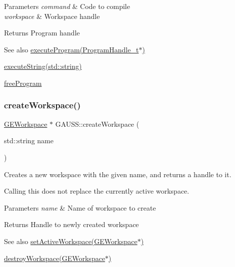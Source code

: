 \begin{DoxyParams}{Parameters}
{\em command} & Code to compile \\
\hline
{\em workspace} & Workspace handle \\
\hline
\end{DoxyParams}
\begin{DoxyReturn}{Returns}
Program handle
\end{DoxyReturn}
\begin{DoxySeeAlso}{See also}
\hyperlink{class_g_a_u_s_s_a7fc9de69421c14aadb9a6310fecabcca}{execute\+Program(\+Program\+Handle\+\_\+t$\ast$)} 

\hyperlink{class_g_a_u_s_s_a3680b0addd695d8a5690a1e2d3fc0d8b}{execute\+String(std\+::string)} 

\hyperlink{class_g_a_u_s_s_a64c8cf4b564aea63ed8e771c969b8936}{free\+Program} 
\end{DoxySeeAlso}
\mbox{\label{class_g_a_u_s_s_a93c2f73d4982037cccfeeeb81dbe7dd2}} 
\subsubsection{\texorpdfstring{create\+Workspace()}{createWorkspace()}}
{\footnotesize\ttfamily \hyperlink{class_g_e_workspace}{G\+E\+Workspace} $\ast$ G\+A\+U\+S\+S\+::create\+Workspace (\begin{DoxyParamCaption}\item[{std\+::string}]{name }\end{DoxyParamCaption})}



Creates a new workspace with the given name, and returns a handle to it. 

Calling this does not replace the currently active workspace.


\begin{DoxyParams}{Parameters}
{\em name} & Name of workspace to create \\
\hline
\end{DoxyParams}
\begin{DoxyReturn}{Returns}
Handle to newly created workspace
\end{DoxyReturn}
\begin{DoxySeeAlso}{See also}
\hyperlink{class_g_a_u_s_s_a6b94adbb7ad799f1e025cd4d7f08f75b}{set\+Active\+Workspace(\+G\+E\+Workspace$\ast$)} 

\hyperlink{class_g_a_u_s_s_ab73fd6b8f6cfd5abb906b8e4e344c007}{destroy\+Workspace(\+G\+E\+Workspace$\ast$)} 
\end{DoxySeeAlso}
\mbox{\label{class_g_a_u_s_s_ab9515a6de5028f18138e6c87e1512c91}} 
